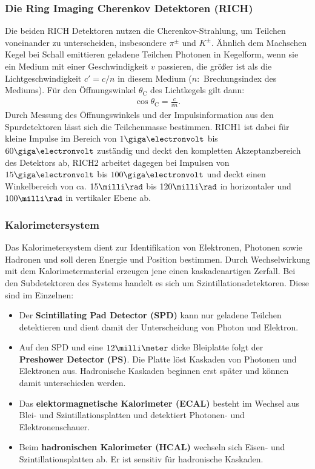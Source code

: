 \subsubsection{Die Ring Imaging Cherenkov Detektoren (RICH)}
Die beiden RICH Detektoren nutzen die Cherenkov-Strahlung, um Teilchen voneinander zu unterscheiden, insbesondere $\pi^{\pm}$ und $K^{\pm}$. Ähnlich dem Machschen Kegel bei Schall emittieren geladene Teilchen Photonen in Kegelform, wenn sie ein Medium mit einer Geschwindigkeit $v$ passieren, die größer ist als die Lichtgeschwindigkeit $c'=c/n$ in diesem Medium ($n:$ Brechungsindex des Mediums). Für den Öffnungswinkel $\theta_{\text{C}}$ des Lichtkegels gilt dann:
\begin{align}
\cos \theta_{\text{C}} = \frac{c}{vn}.
\end{align}
Durch Messung des Öffnungswinkels und der Impulsinformation aus den Spurdetektoren lässt sich die Teilchenmasse bestimmen. RICH1 ist dabei für kleine Impulse im Bereich von $1\giga\electronvolt$ bis $60\giga\electronvolt$ zuständig und deckt den kompletten Akzeptanzbereich des Detektors ab, RICH2 arbeitet dagegen bei Impulsen von $15\giga\electronvolt$ bis $100\giga\electronvolt$ und deckt einen Winkelbereich von ca. $15\milli\rad$ bis $120\milli\rad$ in horizontaler und $100\milli\rad$ in vertikaler Ebene ab.

\subsubsection{Kalorimetersystem}
Das Kalorimetersystem dient zur Identifikation von Elektronen, Photonen sowie Hadronen und soll deren Energie und Position bestimmen. Durch Wechselwirkung mit dem Kalorimetermaterial erzeugen jene einen kaskadenartigen Zerfall. Bei den Subdetektoren des Systems handelt es sich um Szintillationsdetektoren. Diese sind im Einzelnen:
\begin{itemize}
\item Der \textbf{Scintillating Pad Detector (SPD)} kann nur geladene Teilchen detektieren und dient damit der Unterscheidung von Photon und Elektron.
\item Auf den SPD und eine $12\milli\meter$ dicke Bleiplatte folgt der \textbf{Preshower Detector (PS)}. Die Platte löst Kaskaden von Photonen und Elektronen aus. Hadronische Kaskaden beginnen erst später und können damit unterschieden werden.
\item Das \textbf{elektormagnetische Kalorimeter (ECAL)} besteht im Wechsel aus Blei- und Szintillationsplatten und detektiert Photonen- und Elektronenschauer.
\item Beim \textbf{hadronischen Kalorimeter (HCAL)} wechseln sich Eisen- und Szintillationsplatten ab. Er ist sensitiv für hadronische Kaskaden.
\end{itemize}

